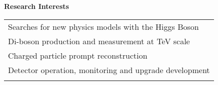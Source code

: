\documentclass[letterpaper,11pt,oneside]{article}
\begin{document}
 \raggedright
 \textbf{\Large{Research Interests} }\\
 \normalsize
 \begin{flushleft}
 \begin{tabular}{@{} l}
     Searches for new physics models with the Higgs Boson \\
     Di-boson production and measurement at TeV scale\\
     Charged particle prompt reconstruction \\
     Detector operation, monitoring and upgrade development\\
     \\
      \end{tabular}
\end{flushleft}
\end{document}
